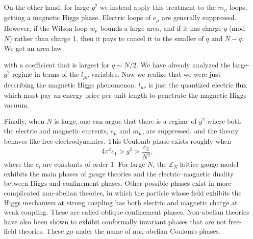 On the other hand, for large $g^2$ we instead apply this treatment to the
$m_\mu$ loops, getting a magnetic Higgs phase. Electric loops of $e_\mu$ are
generally suppressed. However, if the Wilson loop $w_\mu$ bounds a large area,
and if it has charge $q$ (mod $N$) rather than charge 1, then it pays to cancel
it to the smaller of $q$ and $N-q$. We get an area law

with a coefficient that is largest for $q\sim N/2$. We have already analyzed
the large-$g^2$ regime in terms of the $l_{\mu\nu}$ variables. Now we realize
that we were just describing the magnetic Higgs phenomenon. $l_{\mu\nu}$ is
just the quantized electric flux which must pay an energy price per unit length
to penetrate the magnetic Higgs vacuum.

Finally, when $N$ is large, one can argue that there is a regime of $g^2$ where
both the electric and magnetic currents, $e_\mu$ and $m_\mu$, are suppressed,
and the theory behaves like free electrodynamics. This Coulomb phase exists
roughly when
\begin{equation*}
  4\pi^2c_1>g^2>\frac{c_2}{N^2},
\end{equation*}
where the $c_i$ are constants of order 1. For large $N$, the $\mathbb Z_N$
lattice gauge model exhibits the main phases of gauge theories and the
electric--magnetic duality between Higgs and confinement phases. Other possible
phases exist in more complicated non-abelian theories, in which the particle
whose field exhibits the Higgs mechanism at strong coupling has both electric
and magnetic charge at weak coupling. These are called oblique confinement
phases. Non-abelian theories have also been shown to exhibit conformally
invariant phases that are not free-field theories. These go under the name of
non-abelian Coulomb phases.
